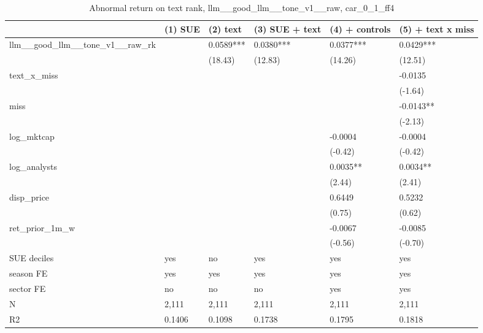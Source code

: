 \begin{table}
\caption{Abnormal return on text rank, llm__good_llm__tone_v1__raw, car_0_1_ff4}
\label{tab:t8_regressions__llm__good_llm__tone_v1__raw__car_0_1_ff4__validation}
\begin{tabular}{llllll}
\toprule
 & (1) SUE & (2) text & (3) SUE + text & (4) + controls & (5) + text x miss \\
\midrule
llm\_\_good\_llm\_\_tone\_v1\_\_raw\_rk &  & 0.0589*** & 0.0380*** & 0.0377*** & 0.0429*** \\
 &  & (18.43) & (12.83) & (14.26) & (12.51) \\
text\_x\_miss &  &  &  &  & -0.0135 \\
 &  &  &  &  & (-1.64) \\
miss &  &  &  &  & -0.0143** \\
 &  &  &  &  & (-2.13) \\
log\_mktcap &  &  &  & -0.0004 & -0.0004 \\
 &  &  &  & (-0.42) & (-0.42) \\
log\_analysts &  &  &  & 0.0035** & 0.0034** \\
 &  &  &  & (2.44) & (2.41) \\
disp\_price &  &  &  & 0.6449 & 0.5232 \\
 &  &  &  & (0.75) & (0.62) \\
ret\_prior\_1m\_w &  &  &  & -0.0067 & -0.0085 \\
 &  &  &  & (-0.56) & (-0.70) \\
SUE deciles & yes & no & yes & yes & yes \\
season FE & yes & yes & yes & yes & yes \\
sector FE & no & no & no & yes & yes \\
N & 2,111 & 2,111 & 2,111 & 2,111 & 2,111 \\
R2 & 0.1406 & 0.1098 & 0.1738 & 0.1795 & 0.1818 \\
\bottomrule
\end{tabular}
\end{table}
